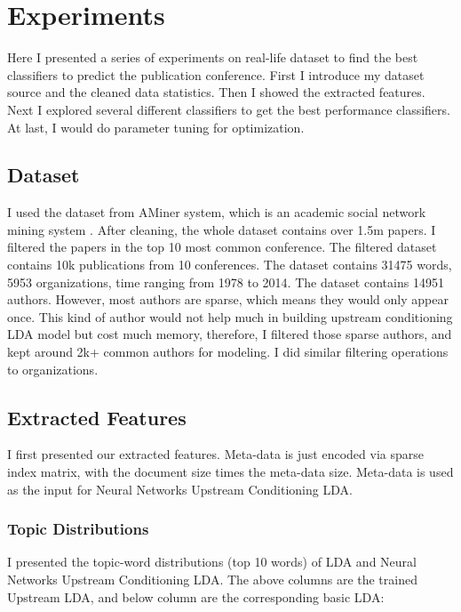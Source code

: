 \section{Experiments}
Here I presented a series of experiments on real-life dataset to find the best
classifiers to predict the publication conference. First I introduce my
dataset source and the cleaned data statistics. Then I showed the extracted
features. Next I explored several different classifiers to get the
best performance classifiers. At last, I would do parameter tuning for
optimization.


\subsection{Dataset}
I used the dataset from AMiner system, which is an academic social network
mining system \cite{tang2008arnetminer}. After cleaning, the whole dataset
contains over 1.5m papers. I filtered the papers in the top 10 most common
conference. The filtered dataset contains 10k publications from 10 conferences.
The dataset contains 31475 words, 5953 organizations, time ranging from 1978 to
2014. The dataset contains 14951 authors. However, most authors are sparse,
which means they would only appear once. This kind of author would not help much
in building upstream conditioning LDA model but cost much memory, therefore,
I filtered those sparse authors, and kept around 2k+ common authors for modeling.
I did similar filtering operations to organizations.



\subsection{Extracted Features}
I first presented our extracted features. Meta-data is just encoded via sparse
index matrix, with the document size times the meta-data size. Meta-data is
used as the input for Neural Networks Upstream Conditioning LDA.

\subsubsection{Topic Distributions}
I presented the topic-word distributions (top 10 words) of LDA and Neural
Networks Upstream Conditioning LDA. The above columns are the trained Upstream LDA,
and below column are the corresponding basic LDA:


